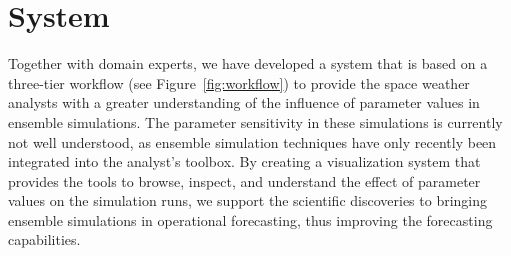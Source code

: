 \documentclass[journal]{vgtc}                %
\begin{document}

\section{System}
Together with domain experts, we have developed a system that is based on a three-tier workflow (see Figure~\ref{fig:workflow}) to provide the space weather analysts with a greater understanding of the influence of parameter values in ensemble simulations. The parameter sensitivity in these simulations is currently not well understood, as ensemble simulation techniques have only recently been integrated into the analyst's toolbox. By creating a visualization system that provides the tools to browse, inspect, and understand the effect of parameter values on the simulation runs, we support the scientific discoveries to bringing ensemble simulations in operational forecasting, thus improving the forecasting capabilities.
\end{document}
